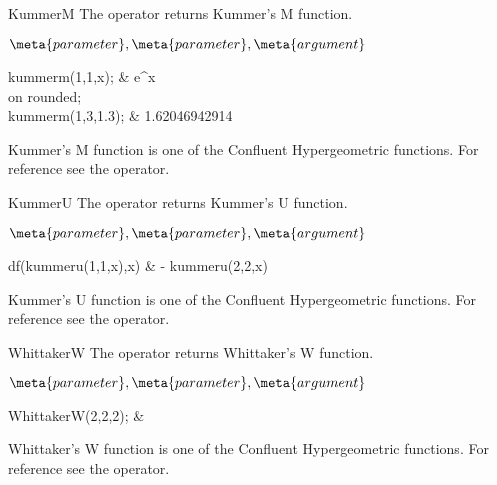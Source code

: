 \begin{Operator}{KummerM}
The  operator returns Kummer's M function.

\begin{Syntax}
\(\meta{parameter},\meta{parameter},\meta{argument}\)
\end{Syntax}

\begin{Examples}
kummerm(1,1,x);               &    e^x \\
on rounded; \\
kummerm(1,3,1.3);             &    1.62046942914
\end{Examples}

\begin{Comments}
Kummer's M function is one of the Confluent Hypergeometric functions.
For reference see the  operator.
\end{Comments}
\end{Operator}

\begin{Operator}{KummerU}
The  operator returns Kummer's U function.

\begin{Syntax}
\(\meta{parameter},\meta{parameter},\meta{argument}\)
\end{Syntax}

\begin{Examples}
df(kummeru(1,1,x),x)           &    - kummeru(2,2,x)
\end{Examples}

\begin{Comments}
Kummer's U function is one of the Confluent Hypergeometric functions.
For reference see the  operator.
\end{Comments}
\end{Operator}

\begin{Operator}{WhittakerW}
The  operator returns Whittaker's W function.

\begin{Syntax}
\(\meta{parameter},\meta{parameter},\meta{argument}\)
\end{Syntax}

\begin{Examples}
WhittakerW(2,2,2);     &    
\end{Examples}

\begin{Comments}
Whittaker's W function is one of the Confluent Hypergeometric functions.
For reference see the  operator.
\end{Comments}
\end{Operator}


